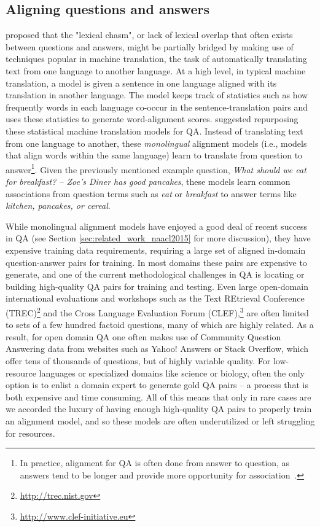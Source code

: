 \subsection{Aligning questions and answers}
\label{sec:intro_naacl2015}
\citet{Berger:00} proposed that the "lexical chasm", or lack of lexical overlap that often exists between questions and answers, might be partially bridged by making use of techniques popular in machine translation, the task of automatically translating text from one language to another language.  At a high level, in typical machine translation, a model is given a sentence in one language aligned with its translation in another language.  The model keeps track of statistics such as how frequently words in each language co-occur in the sentence-translation pairs and uses these statistics to generate word-alignment scores.  \citeauthor{Berger:00} suggested repurposing these statistical machine translation models for QA. Instead of translating text from one language to another, these \emph{monolingual} alignment models (i.e., models that align words within the same language) learn to translate from question to answer\footnote{In practice, alignment for QA is often done from answer to question, as answers tend to be longer and provide more opportunity for association~\citep{Surdeanu:11}.}.  Given the previously mentioned example question, {\em What should we eat for breakfast? -- Zoe's Diner has good pancakes}, these models learn common associations from question terms such as {\em eat} or {\em breakfast} to answer terms like {\em kitchen, pancakes, or cereal}.

While monolingual alignment models have enjoyed a good deal of recent success in QA (see Section \ref{sec:related_work_naacl2015} for more discussion), they have expensive training data requirements,  
requiring a large set of aligned in-domain question-answer pairs for training.
In most domains these pairs are expensive to generate, and one of the current methodological challenges in QA is locating or building high-quality QA pairs for training and testing. Even large open-domain international evaluations and workshops such as the Text REtrieval Conference (TREC)\footnote{\url{http://trec.nist.gov}} and the Cross Language Evaluation Forum (CLEF),\footnote{\url{http://www.clef-initiative.eu}} are often limited to sets of a few hundred factoid questions, many of which are highly related.  As a result, for open domain QA one often makes use of Community Question Answering data from websites such as Yahoo! Answers or Stack Overflow, which offer tens of thousands of questions, but of highly variable quality.  
For low-resource languages or specialized domains like science or biology, often the only option is to enlist a domain expert to generate gold QA pairs --  a process that is both expensive and time consuming.  All of this means that only in rare cases are we accorded the luxury of having enough high-quality QA pairs to properly train an alignment model, and so these models are often underutilized or left struggling for resources. 

